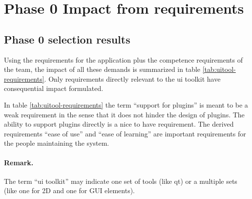 \section{Phase 0 Impact from requirements}

\subsection{Phase 0 selection results}

Using the requirements for the application plus the competence requirements of
the team, the impact of all these demands is summarized in table
\ref{tab:uitool-requirements}. Only requirements directly relevant to the ui
toolkit have consequential impact formulated.

In table \ref{tab:uitool-requirements} the term ``support for plugins'' is
meant to be a weak requirement in the sense that it does not hinder the design
of plugins. The ability to support plugins directly is a nice to have
requirement. The derived requirements ``ease of use'' and ``ease of learning''
are important requirements for the people maintaining the system.

\paragraph{Remark.} The term ``ui toolkit'' may indicate one set of tools (like
qt) or a multiple sets (like one for 2D and one for GUI elements).


